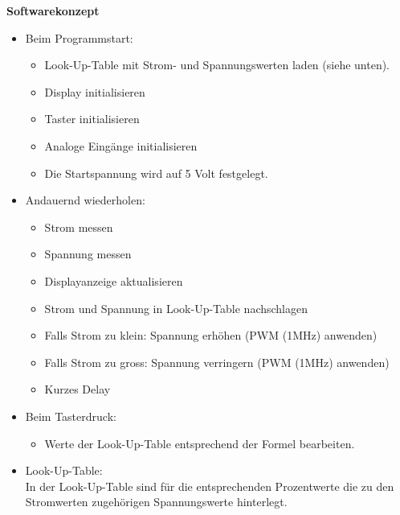 \documentclass{fhnwreport}
\begin{document}
\newpage
\textbf{Softwarekonzept}
\begin{itemize}
\item Beim Programmstart:
	\begin{itemize}
	\item Look-Up-Table mit Strom- und Spannungswerten laden (siehe unten).
	\item Display initialisieren
	\item Taster initialisieren
	\item Analoge Eingänge initialisieren
	\item Die Startspannung wird auf 5 Volt festgelegt.
	\end{itemize}

\item Andauernd wiederholen:
	\begin{itemize}
	\item Strom messen
	\item Spannung messen
	\item Displayanzeige aktualisieren
	\item Strom und Spannung in Look-Up-Table nachschlagen
	\item Falls Strom zu klein: Spannung erhöhen (PWM (1MHz) anwenden)
	\item Falls Strom zu gross: Spannung verringern  (PWM (1MHz) anwenden)
	\item Kurzes Delay
	\end{itemize}
	
\item Beim Tasterdruck:
	\begin{itemize}
	\item Werte der Look-Up-Table entsprechend der Formel bearbeiten.
	\end{itemize}
	
\item Look-Up-Table:\\
In der Look-Up-Table sind für die entsprechenden Prozentwerte die zu den Stromwerten zugehörigen Spannungswerte hinterlegt.
\end{itemize}
\end{document}
